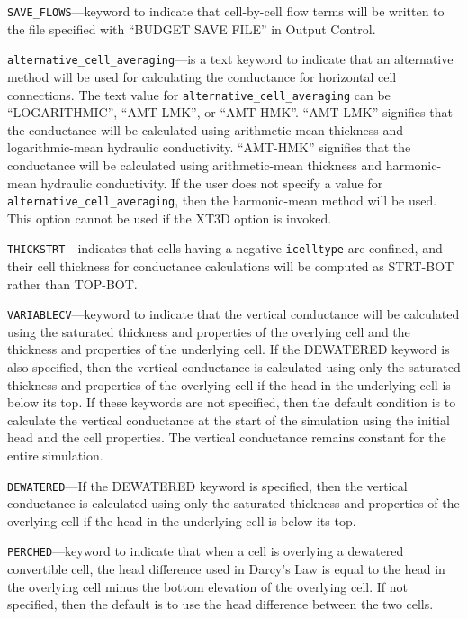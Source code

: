 
\item \texttt{SAVE\_FLOWS}---keyword to indicate that cell-by-cell flow terms will be written to the file specified with ``BUDGET SAVE FILE'' in Output Control.

\item \texttt{alternative\_cell\_averaging}---is a text keyword to indicate that an alternative method will be used for calculating the conductance for horizontal cell connections.  The text value for \texttt{alternative\_cell\_averaging} can be ``LOGARITHMIC'', ``AMT-LMK'', or ``AMT-HMK''.  ``AMT-LMK'' signifies that the conductance will be calculated using arithmetic-mean thickness and logarithmic-mean hydraulic conductivity.  ``AMT-HMK'' signifies that the conductance will be calculated using arithmetic-mean thickness and harmonic-mean hydraulic conductivity. If the user does not specify a value for \texttt{alternative\_cell\_averaging}, then the harmonic-mean method will be used.  This option cannot be used if the XT3D option is invoked.

\item \texttt{THICKSTRT}---indicates that cells having a negative \texttt{icelltype} are confined, and their cell thickness for conductance calculations will be computed as STRT-BOT rather than TOP-BOT.

\item \texttt{VARIABLECV}---keyword to indicate that the vertical conductance will be calculated using the saturated thickness and properties of the overlying cell and the thickness and properties of the underlying cell.  If the DEWATERED keyword is also specified, then the vertical conductance is calculated using only the saturated thickness and properties of the overlying cell if the head in the underlying cell is below its top.  If these keywords are not specified, then the default condition is to calculate the vertical conductance at the start of the simulation using the initial head and the cell properties.  The vertical conductance remains constant for the entire simulation.

\item \texttt{DEWATERED}---If the DEWATERED keyword is specified, then the vertical conductance is calculated using only the saturated thickness and properties of the overlying cell if the head in the underlying cell is below its top.

\item \texttt{PERCHED}---keyword to indicate that when a cell is overlying a dewatered convertible cell, the head difference used in Darcy's Law is equal to the head in the overlying cell minus the bottom elevation of the overlying cell.  If not specified, then the default is to use the head difference between the two cells.

